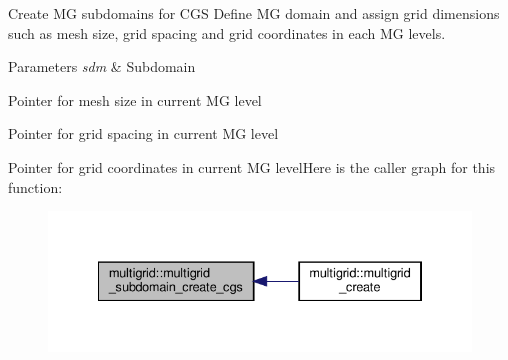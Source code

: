 Create MG subdomains for C\+GS  Define MG domain and assign grid dimensions such as mesh size, grid spacing and grid coordinates in each MG levels. 


\begin{DoxyParams}{Parameters}
{\em sdm} & Subdomain \\
\hline
\end{DoxyParams}
Pointer for mesh size in current MG level

Pointer for grid spacing in current MG level

Pointer for grid coordinates in current MG levelHere is the caller graph for this function\+:
\nopagebreak
\begin{figure}[H]
\begin{center}
\leavevmode
\includegraphics[width=334pt]{namespacemultigrid_acb52ce247bf637e69274d8da44d1f159_icgraph}
\end{center}
\end{figure}
